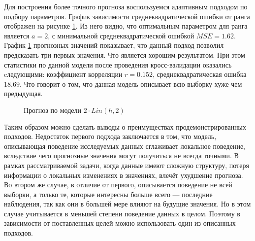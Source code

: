 Для построения более точного прогноза воспользуемся адаптивным подходом по подбору параметров. График зависимости среднеквадратической ошибки от ранга отображен на рисунке \ref{img:lin-adapt-pred}. Из него видно, что оптимальным параметром для ранга является $ a = 2 $, с минимальной среднеквадратической ошибкой $ MSE = 1.62 $. График \ref{img:lin-adapt-pred} прогнозных значений показывает, что данный подход позволил предсказать три первых значения. Что является хорошим результатом. При этом статистики по данной модели после проведения кросс-валидации оказались cледующими: коэффициент корреляции $ r = 0.152 $, среднеквадратическая ошибка $ 18.69 $. Что говорит о том, что данная модель описывает всю выборку хуже чем предыдущая. %
\begin{figure}[ht]
\caption{Прогноз по модели $ 2 \cdot Lin(h, 2) $}
\label{img:lin-adapt-pred}
\end{figure}

Таким образом можно сделать выводы о преимуществах продемонстрированных подходов. Недостаток первого подхода заключается в том, что модель, описывающая поведение исследуемых данных сглаживает локальное поведение, вследствие чего прогнозные значения могут получиться не всегда точными. В рамках рассматриваемой задачи, когда данные имеют сложную структуру, потеря информации о локальных изменениях в значениях, влечёт ухудшение прогноза. Во втором же случае, в отличие от первого, описывается поведение не всей выборки, а только те, которые интересны больше всего --- последние наблюдения, так как они в большей мере влияют на будущие значения. Но в этом случае учитывается в меньшей степени поведение данных в целом. Поэтому в зависимости от поставленных целей можно использовать один из описанных подходов.

